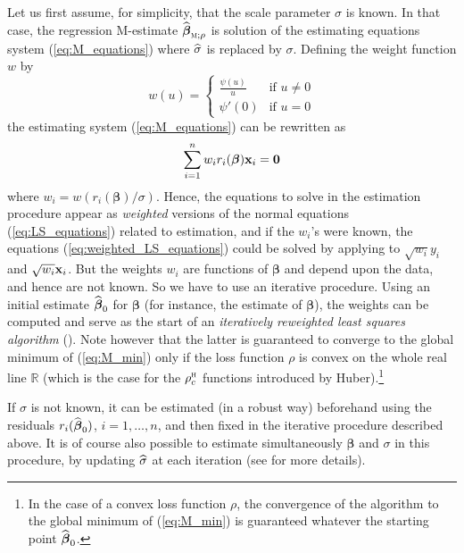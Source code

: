 Let us first assume, for simplicity, that the scale parameter $\sigma$ is
known. In that case, the regression M-estimate
$\sthat{\boldsymbol\beta}_{\stsc{M};\rho}$ is solution of the estimating
equations system (\ref{eq:M_equations}) where $\widehat{\sigma}$ is replaced by
$\sigma$. Defining the weight function $w$ by
\[
    w(u) = 
    \begin{cases}
        \frac{\psi(u)}{u} & \text{if $u\neq0$}\\
        \psi'(0)          & \text{if $u=0$}
    \end{cases}
\]
the estimating system (\ref{eq:M_equations}) can be rewritten as
%
\begin{equation}\label{eq:weighted_LS_equations}
    \sum_{i=1}^{n} w_{i} r_{i}(\boldsymbol\beta) \mathbf x_{i} = \mathbf{0}
\end{equation}
%
where $w_{i} = w(r_{i}(\boldsymbol\beta)/\sigma)$. Hence, the equations to
solve in the  estimation procedure appear as \emph{weighted} versions
of the normal equations (\ref{eq:LS_equations}) related to 
estimation, and if the $w_{i}$'s were known, the equations
(\ref{eq:weighted_LS_equations}) could be solved by applying  to
$\sqrt{w_{i}}y_{i}$ and $\sqrt{w_{i}}\mathbf x_{i}$. But the weights $w_{i}$
are functions of $\boldsymbol\beta$ and depend upon the data, and hence are not
known. So we have to use an iterative procedure. Using an initial estimate
$\widehat{\boldsymbol\beta}_0$ for $\boldsymbol\beta$ (for instance, the
 estimate of $\boldsymbol\beta$), the weights can be computed and
serve as the start of an \emph{iteratively reweighted least squares algorithm}
(). Note however that the latter is guaranteed to converge to the
global minimum of (\ref{eq:M_min}) only if the loss function $\rho$ is convex
on the whole real line $\mathbb{R}$ (which is the case for the
$\rho_{c}^{\stsc{H}}$ functions introduced by Huber).\footnote{In the case of
a convex loss function $\rho$, the convergence of the algorithm to the global
minimum of (\ref{eq:M_min}) is guaranteed whatever the starting point
$\widehat{\boldsymbol\beta}_0$.}

If $\sigma$ is not known, it can be estimated (in a robust way) beforehand
using the residuals $r_{i}(\widehat{\boldsymbol\beta}_0)$, $i = 1, \dots, n$,
and then fixed in the iterative procedure described above. It is of course
also possible to estimate simultaneously $\boldsymbol\beta$ and $\sigma$ in
this procedure, by updating $\widehat{\sigma}$ at each iteration (see
\citealp{maronna:etal:2006} for more details).

